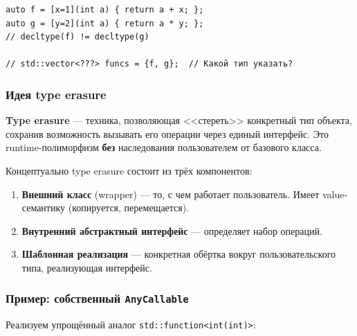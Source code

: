 \documentclass[a4paper,12pt]{article}
\begin{document}
\begin{lstlisting}
auto f = [x=1](int a) { return a + x; };
auto g = [y=2](int a) { return a * y; };
// decltype(f) != decltype(g)

// std::vector<???> funcs = {f, g};  // Какой тип указать?
\end{lstlisting}

\subsubsection{Идея type erasure}

\textbf{Type erasure} --- техника, позволяющая <<стереть>> конкретный тип объекта,
сохранив возможность вызывать его операции через единый интерфейс.
Это runtime-полиморфизм \textbf{без} наследования пользователем от базового класса.

Концептуально type erasure состоит из трёх компонентов:

\begin{enumerate}
    \item \textbf{Внешний класс} (wrapper) --- то, с чем работает пользователь.
          Имеет value-семантику (копируется, перемещается).
    \item \textbf{Внутренний абстрактный интерфейс} --- определяет набор операций.
    \item \textbf{Шаблонная реализация} --- конкретная обёртка вокруг
          пользовательского типа, реализующая интерфейс.
\end{enumerate}

\subsubsection{Пример: собственный \texttt{AnyCallable}}

Реализуем упрощённый аналог \texttt{std::function<int(int)>}:
\end{document}
